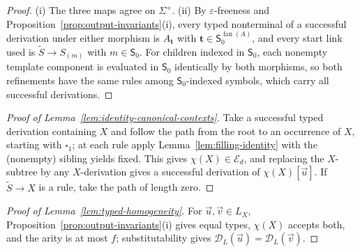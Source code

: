 \documentclass[11pt]{article}
\numberwithin{equation}{section}
\theoremstyle{plain}
\theoremstyle{definition}
\theoremstyle{remark}
\newcommand{\D}{\mathcal{D}}
\newcommand{\tuple}[1]{\vec{#1}}
\newcommand{\blank}{\square}
\newcommand{\eps}{\varepsilon}
\newcommand{\fan}{\operatorname{fan}}
\theoremstyle{plain}
\begin{document}
\begin{proof}
(i) The three maps agree on $\Sigma^+$.  (ii) By $\eps$-freeness and
Proposition~\ref{prop:output-invariants}(i), every typed nonterminal of a successful
derivation under either morphism is $A_{\mathbf t}$ with $\mathbf t\in \mathsf S_0^{\fan(A)}$, and
every start link used is $\widetilde S\to S_{(m)}$ with $m\in \mathsf S_0$.  For children
indexed in $\mathsf S_0$, each nonempty template component is evaluated in $\mathsf S_0$ identically by
both morphisms, so both refinements have the same rules among $\mathsf S_0$-indexed symbols,
which carry all successful derivations.
\end{proof}

\begin{proof}[Proof of Lemma~\ref{lem:identity-canonical-contexts}]
Take a successful typed derivation containing $X$ and follow the path from the root to
an occurrence of $X$, starting with $\blank_1$; at each rule apply
Lemma~\ref{lem:filling-identity} with the (nonempty) sibling yields fixed.  This gives
$\chi(X)\in\mathcal E_d$, and replacing the $X$-subtree by any $X$-derivation gives a
successful derivation of $\chi(X)[\tuple u]$.  If $\widetilde S\to X$ is a rule, take the
path of length zero.
\end{proof}

\begin{proof}[Proof of Lemma~\ref{lem:typed-homogeneity}]
For $\tuple u,\tuple v\in L_X$, Proposition~\ref{prop:output-invariants}(i) gives equal
types, $\chi(X)$ accepts both, and the arity is at most $f$; substitutability gives
$\D_L(\tuple u)=\D_L(\tuple v)$.
\end{proof}
\end{document}

